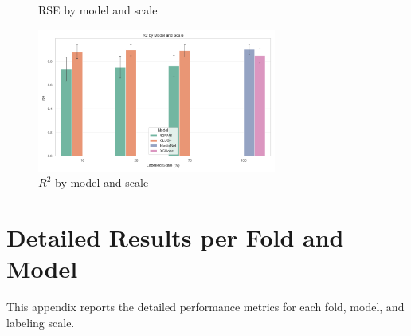 \documentclass{article}
\begin{document}
\begin{appendices}
\begin{figure}[!ht]
    \caption{RSE by model and scale}
    \label{fig:rse}
\end{figure}
\begin{figure}[!ht]
    \centering
    \includegraphics[width=0.7\textwidth]{figures/r2_by_model_and_scale.png}
    \caption{$R^2$ by model and scale}
    \label{fig:r2}
\end{figure}

\newpage
\section{Detailed Results per Fold and Model}
\label{app:detailed_results}

\noindent
This appendix reports the detailed performance metrics for each fold, model, and labeling scale.


\end{appendices}
\end{document}
